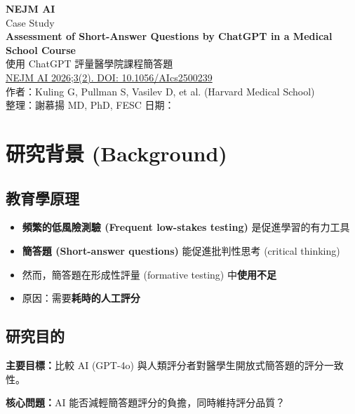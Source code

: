 \documentclass[12pt,a4paper]{article}
\begin{document}
\begin{center}
{\LARGE\bfseries\textcolor{emergency_red}{NEJM AI}}\\[0.3cm]
{\Large\textcolor{emergency_blue}{Case Study}}\\[0.5cm]
{\Large\textbf{Assessment of Short-Answer Questions by ChatGPT in a Medical School Course}}\\[0.3cm]
{\large 使用 ChatGPT 評量醫學院課程簡答題}\\[0.5cm]
{\normalsize \href{https://doi.org/10.1056/AIcs2500239}{NEJM AI 2026;3(2). DOI: 10.1056/AIcs2500239}}\\[0.3cm]
{\normalsize 作者：Kuling G, Pullman S, Vasilev D, et al. (Harvard Medical School)}\\[0.3cm]
{\normalsize 整理：謝慕揚 MD, PhD, FESC \quad 日期：\mydate}
\end{center}

\vspace{0.5cm}

\section{研究背景 (Background)}

\subsection{教育學原理}

\begin{itemize}[leftmargin=2em]
    \item \textbf{頻繁的低風險測驗 (Frequent low-stakes testing)} 是促進學習的有力工具
    \item \textbf{簡答題 (Short-answer questions)} 能促進批判性思考 (critical thinking)
    \item 然而，簡答題在形成性評量 (formative testing) 中\textbf{使用不足}
    \item 原因：需要\textbf{耗時的人工評分}
\end{itemize}

\subsection{研究目的}

\begin{importantbox}
\textbf{主要目標：}比較 AI (GPT-4o) 與人類評分者對醫學生開放式簡答題的評分一致性。

\textbf{核心問題：}AI 能否減輕簡答題評分的負擔，同時維持評分品質？
\end{importantbox}
\end{document}
